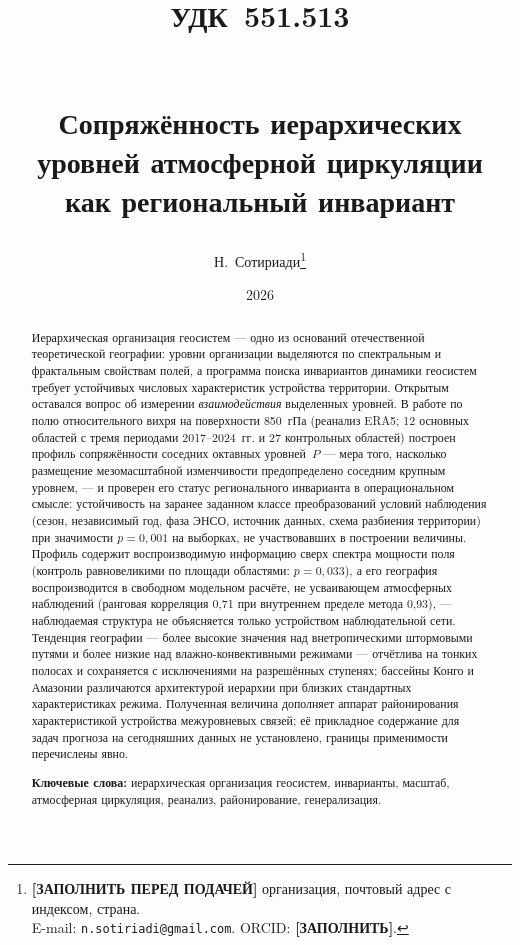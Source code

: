 \documentclass[11pt,a4paper]{article}
\title{{\normalsize\normalfont\hspace*{-\leftskip}\parbox{\linewidth}{\raggedright УДК~551.513}}\\[1.5em]
Сопряжённость иерархических уровней атмосферной циркуляции\\
как региональный инвариант}
\author{Н.~Сотириади\thanks{%
  \textbf{[ЗАПОЛНИТЬ ПЕРЕД ПОДАЧЕЙ]} организация, почтовый адрес с индексом, страна.\\
  E-mail: \texttt{n.sotiriadi@gmail.com}. ORCID: \textbf{[ЗАПОЛНИТЬ]}.}}
\date{2026}
\begin{document}
\maketitle

\begin{abstract}
Иерархическая организация геосистем --- одно из оснований отечественной теоретической географии: уровни организации выделяются по спектральным и фрактальным свойствам полей, а программа поиска инвариантов динамики геосистем требует устойчивых числовых характеристик устройства территории. Открытым оставался вопрос об измерении \emph{взаимодействия} выделенных уровней. В работе по полю относительного вихря на поверхности 850~гПа (реанализ ERA5; 12 основных областей с тремя периодами 2017--2024~гг. и 27 контрольных областей) построен профиль сопряжённости соседних октавных уровней~$P$ --- мера того, насколько размещение мезомасштабной изменчивости предопределено соседним крупным уровнем, --- и проверен его статус регионального инварианта в операциональном смысле: устойчивость на заранее заданном классе преобразований условий наблюдения (сезон, независимый год, фаза ЭНСО, источник данных, схема разбиения территории) при значимости $p=0{,}001$ на выборках, не участвовавших в построении величины. Профиль содержит воспроизводимую информацию сверх спектра мощности поля (контроль равновеликими по площади областями: $p=0{,}033$), а его география воспроизводится в свободном модельном расчёте, не усваивающем атмосферных наблюдений (ранговая корреляция 0,71 при внутреннем пределе метода 0,93), --- наблюдаемая структура не объясняется только устройством наблюдательной сети. Тенденция географии --- более высокие значения над внетропическими штормовыми путями и более низкие над влажно-конвективными режимами --- отчётлива на тонких полосах и сохраняется с исключениями на разрешённых ступенях; бассейны Конго и Амазонии различаются архитектурой иерархии при близких стандартных характеристиках режима. Полученная величина дополняет аппарат районирования характеристикой устройства межуровневых связей; её прикладное содержание для задач прогноза на сегодняшних данных не установлено, границы применимости перечислены явно.

\smallskip
\noindent\textbf{Ключевые слова:} иерархическая организация геосистем, инварианты, масштаб, атмосферная циркуляция, реанализ, районирование, генерализация.
\end{abstract}
\end{document}
